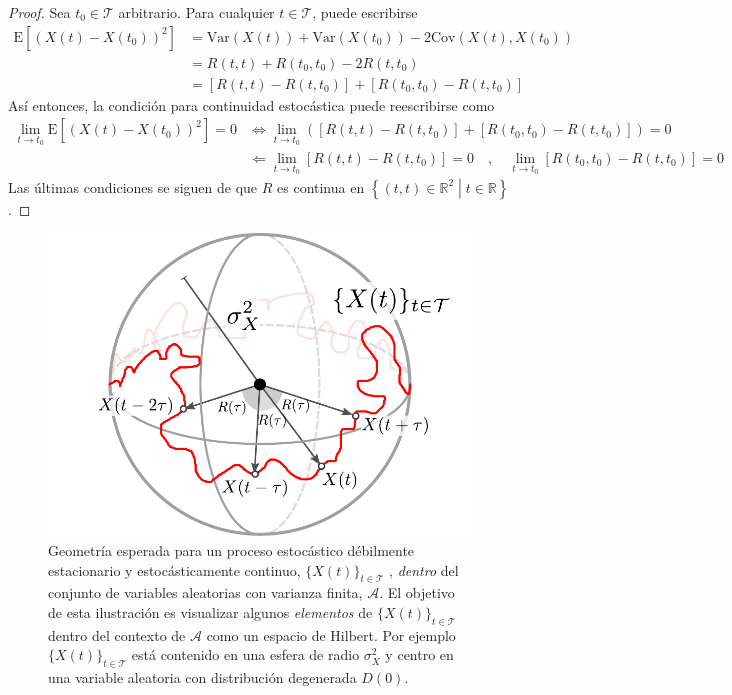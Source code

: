 \documentclass[12pt,letterpaper]{book}
\newcommand{\R}{\mathbb{R}}
\newcommand{\E}[1]{\mathrm{E}\left[ #1 \right]}
\newcommand{\Var}[1]{\mathrm{Var}\left( #1 \right)}
\newcommand{\Cov}[1]{\mathrm{Cov}\left( #1 \right)}
\newcommand{\xt}{$\{X(t)\}_{t\in \mathcal{T}}$ }
\newcommand{\talque}{\mathrel{}\middle|\mathrel{}}
\begin{document}
\begin{proof}
Sea $t_0\in\mathcal{T}$ arbitrario. Para cualquier $t\in \mathcal{T}$, puede escribirse
\begin{align*}
\E{\left( X(t) - X(t_0) \right)^{2}} &= \Var{X(t)} + \Var{X(t_0)} - 2 \Cov{X(t),X(t_0)} \\
&= R(t,t) + R(t_0,t_0)  - 2 R(t,t_0) \\
&= \left[ R(t,t) - R(t,t_0) \right] + \left[ R(t_0,t_0)  - R(t,t_0) \right]
\end{align*}
Así entonces, la condición para continuidad estocástica puede reescribirse como
\begin{align*}
\lim_{t \rightarrow t_0} \E{\left( X(t) - X(t_0) \right)^{2}} = 0 
&\Leftrightarrow
\lim_{t \rightarrow t_0} \left( \left[ R(t,t) - R(t,t_0) \right] + \left[ R(t_0,t_0)  - R(t,t_0) \right] \right) = 0 \\
&\Leftarrow 
\lim_{t \rightarrow t_0} \left[ R(t,t) - R(t,t_0) \right] = 0 \quad , \quad \lim_{t \rightarrow t_0} \left[ R(t_0,t_0)  - R(t,t_0) \right] = 0 
\end{align*}
Las últimas condiciones se siguen de que $R$ es continua en $\left\{ (t,t) \in \R^2 \talque t\in \R \right\}$.
\end{proof}

\begin{figure}
\centering
\includegraphics[width=.6\textwidth]{./img_diagramas/esfera_v1.pdf}
\caption[Geometría esperada para un proceso estocástico débilmente estacionario y estocásticamente continuo \textit{dentro} del espacio de variables aleatorias con varianza finita.]{Geometría esperada para un proceso estocástico débilmente estacionario y estocásticamente continuo, \xt , \textit{dentro} del conjunto de variables aleatorias con varianza finita, $\mathcal{A}$.
%
El objetivo de esta ilustración es visualizar algunos \textit{elementos} de \xt dentro del contexto de $\mathcal{A}$ como un espacio de Hilbert. Por ejemplo \xt está contenido en una esfera de radio $\sigma_X^2$ y centro en una variable aleatoria con distribución degenerada $D(0)$.}
\end{figure}
\end{document}
